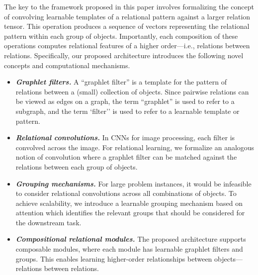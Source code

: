 The key to the framework proposed in this paper involves formalizing the concept of convolving learnable templates of a relational pattern against a larger relation tensor. This operation produces a sequence of vectors representing the relational pattern within each group of objects. Importantly, each composition of these operations computes relational features of a higher order---i.e., relations between relations. Specifically, our proposed architecture introduces the following novel concepts and computational mechanisms.
\begin{itemize}[itemsep=1pt]
    \item \textit{\bfseries Graphlet filters.} A ``graphlet filter'' is a template for the pattern of relations between a (small) collection of objects. 
    Since pairwise relations can be viewed as edges on a graph, the term ``graphlet'' is used to refer to a subgraph, and the term `filter'' is used to refer to a learnable template or pattern.
    \item \textit{\bfseries Relational convolutions.} In CNNs for image processing, each filter is
    convolved across the image. For relational learning, we formalize an analogous notion of convolution where a graphlet filter can be matched against the relations between each group of objects.
    \item \textit{\bfseries Grouping mechanisms.} For large problem instances, it would be infeasible to consider relational convolutions across all combinations of objects. To achieve scalability, we introduce a learnable grouping mechanism based on attention which identifies the relevant groups that should be considered for the downstream task. %
    \item \textit{\bfseries Compositional relational modules.} The proposed architecture supports composable modules, where each module has learnable graphlet filters and groups. This enables learning higher-order relationships between objects---relations between relations.
\end{itemize}

